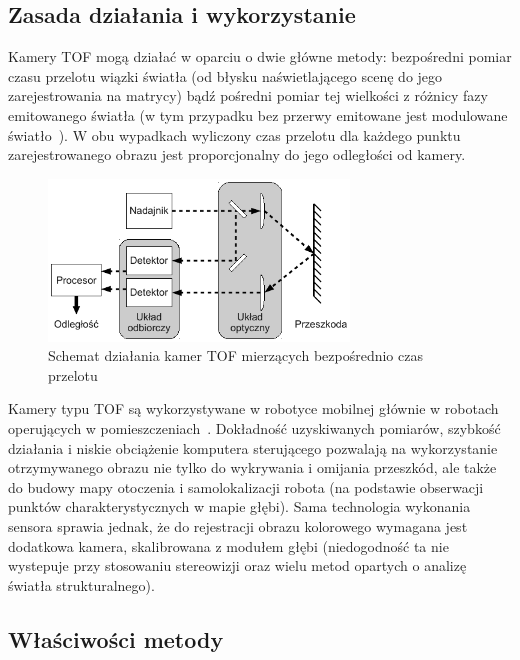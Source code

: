 \subsection{Zasada działania i wykorzystanie}

Kamery TOF mogą działać w oparciu o dwie główne metody: bezpośredni pomiar
czasu przelotu wiązki światła (od błysku naświetlającego scenę do jego
zarejestrowania na matrycy) bądź pośredni pomiar tej wielkości z różnicy fazy
emitowanego światła (w tym przypadku bez przerwy emitowane jest modulowane
światło~\cite{910448}). W obu wypadkach wyliczony czas przelotu dla każdego
punktu zarejestrowanego obrazu jest proporcjonalny do jego odległości od kamery.

\begin{figure}[h!]
\centering
\includegraphics[width=8cm]{../../Common/img/tof}
\caption{Schemat działania kamer TOF mierzących bezpośrednio czas przelotu}
\label{fig:tof}
\end{figure}

Kamery typu TOF są wykorzystywane w robotyce mobilnej głównie w robotach
operujących w pomieszczeniach~\cite{Prusak:2008:PEM:1462089.1462102}. Dokładność
uzyskiwanych pomiarów, szybkość działania i niskie obciążenie komputera
sterującego pozwalają na wykorzystanie otrzymywanego obrazu nie tylko do
wykrywania i omijania przeszkód, ale także do budowy mapy otoczenia i
samolokalizacji robota (na podstawie obserwacji punktów charakterystycznych w
mapie głębi). Sama technologia wykonania sensora sprawia jednak, że do
rejestracji obrazu kolorowego wymagana jest dodatkowa kamera, skalibrowana z
modułem głębi (niedogodność ta nie wystepuje przy stosowaniu stereowizji oraz
wielu metod opartych o analizę światła strukturalnego).

\subsection{Właściwości metody}

